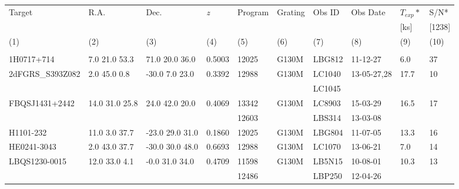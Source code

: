 \documentclass[twocolumn,tighten]{aastex6}
\begin{document}
\begin{table}[ht]\footnotesize
\begin{center}
\begin{tabular}{l l l l l l l l l l}
 \hline \hline
  Target 		& R.A. 		& Dec. 		& \textit{z}		 & Program 	  & Grating 	  & Obs ID 	    & Obs Date 	    & $T_{exp}*$     & S/N*  \\ 
  	    		& 	       		&	  		& 		  	 & 		    	  & 		  	  & 		  	   & 		     	    & 	        [ks]        & [1238] \\ 
 \scriptsize (1)  & \scriptsize (2) & \scriptsize (3) & \scriptsize (4) & \scriptsize (5) & \scriptsize (6) & \scriptsize  (7) & \scriptsize (8) & \scriptsize (9) & \scriptsize (10)  \\ \hline \hline
\\
    
1H0717+714		  &  7.0  21.0   53.3  &     71.0  20.0  36.0  &    0.5003  & 12025  	    &   G130M  &   LBG812  		 & 11-12-27      	 	  &  6.0    &      37         \\
2dFGRS\_S393Z082  &  2.0  45.0    0.8   &    -30.0    7.0  23.0  &    0.3392  & 12988  	    &   G130M  &   LC1040    		 & 13-05-27,28 	 	  & 17.7   &      10         \\
				  &			       &				&		  &			    &		      &    LC1045			 &				  &	       &		   \\
FBQSJ1431+2442     & 14.0  31.0  25.8  &     24.0  42.0  20.0  &   0.4069   & 13342		    &   G130M  &   LC8903			& 15-03-29		  & 16.5  &      17          \\
				 &			      &				       &		 & 12603		    &		      &   LBS314			& 13-03-08		  &	      &		  	  \\

H1101-232   		 &  11.0  3.0   37.7  &    -23.0  29.0  31.0  &   0.1860   & 12025  		    &   G130M  &   LBG804  		& 11-07-05  		   & 13.3  &      16         \\
HE0241-3043  		 &   2.0  43.0  37.7  &    -30.0  30.0  48.0  &   0.6693   & 12988  		    &   G130M  &   LC1070  		& 13-06-21  		   & 7.0    &      14         \\
LBQS1230-0015  	 &   12.0  33.0  4.1  &    -0.0  31.0  34.0    &    0.4709  & 11598   	    &   G130M  &   LB5N15			& 10-08-01  		   & 10.3  &      13         \\
				 &			      &				       &		 & 12486		    &		      &   LBP250			& 12-04-26		   &	       &	  	   \\


\end{tabular}
\end{center}
\end{table}
\end{document}
